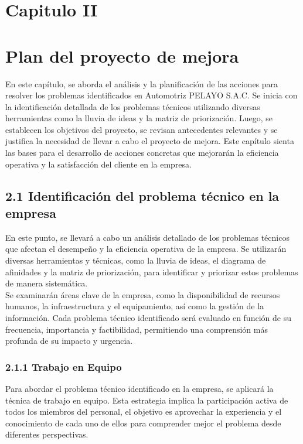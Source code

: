 \newpage
\section{Capitulo II}
\section*{Plan del proyecto de mejora}
En este capítulo, se aborda el análisis y la planificación de las acciones para resolver los problemas identificados en Automotriz PELAYO S.A.C. Se inicia con la identificación detallada de los problemas técnicos utilizando diversas herramientas como la lluvia de ideas y la matriz de priorización. Luego, se establecen los objetivos del proyecto, se revisan antecedentes relevantes y se justifica la necesidad de llevar a cabo el proyecto de mejora. Este capítulo sienta las bases para el desarrollo de acciones concretas que mejorarán la eficiencia operativa y la satisfacción del cliente en la empresa.

\subsection{2.1 Identificación del problema técnico en la empresa}
En este punto, se llevará a cabo un análisis detallado de los problemas técnicos que afectan el desempeño y la eficiencia operativa de la empresa. Se utilizarán diversas herramientas y técnicas, como la lluvia de ideas, el diagrama de afinidades y la matriz de priorización, para identificar y priorizar estos problemas de manera sistemática.\\
Se examinarán áreas clave de la empresa, como la disponibilidad de recursos humanos, la infraestructura y el equipamiento, así como la gestión de la información. Cada problema técnico identificado será evaluado en función de su frecuencia, importancia y factibilidad, permitiendo una comprensión más profunda de su impacto y urgencia.

\subsubsection*{2.1.1 Trabajo en Equipo}
Para abordar el problema técnico identificado en la empresa, se aplicará la técnica de trabajo en equipo. Esta estrategia implica la participación activa de todos los miembros del personal,
el objetivo es aprovechar la experiencia y el conocimiento de cada uno de ellos para comprender mejor el problema desde diferentes perspectivas.
